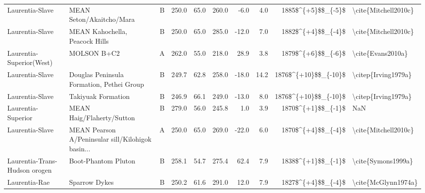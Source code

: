 \begin{longtable}{p{1 in}p{1 in}rrrrrrr}
               Laurentia-Slave &                           MEAN Seton/Akaitcho/Mara &      B &     250.0 &      65.0 & 260.0 &  -6.0 &       4.0 &     1885\$\textasciicircum \{+5\}\$\$\_\{-5\}\$ &                               \textbackslash cite\{Mitchell2010c\} \\
               Laurentia-Slave &                     MEAN Kahochella, Peacock Hills &      B &     250.0 &      65.0 & 285.0 & -12.0 &       7.0 &     1882\$\textasciicircum \{+4\}\$\$\_\{-4\}\$ &                               \textbackslash cite\{Mitchell2010c\} \\
      Laurentia-Superior(West) &                                        MOLSON B+C2 &      A &     262.0 &      55.0 & 218.0 &  28.9 &       3.8 &     1879\$\textasciicircum \{+6\}\$\$\_\{-6\}\$ &                                  \textbackslash cite\{Evans2010a\} \\
               Laurentia-Slave &          Douglas Peninsula Formation, Pethei Group &      B &     249.7 &      62.8 & 258.0 & -18.0 &      14.2 &   1876\$\textasciicircum \{+10\}\$\$\_\{-10\}\$ &                                \textbackslash citep\{Irving1979a\} \\
               Laurentia-Slave &                                 Takiyuak Formation &      B &     246.9 &      66.1 & 249.0 & -13.0 &       8.0 &   1876\$\textasciicircum \{+10\}\$\$\_\{-10\}\$ &                                \textbackslash citep\{Irving1979a\} \\
            Laurentia-Superior &                          MEAN Haig/Flaherty/Sutton &      B &     279.0 &      56.0 & 245.8 &   1.0 &       3.9 &     1870\$\textasciicircum \{+1\}\$\$\_\{-1\}\$ &                                                NaN \\
               Laurentia-Slave &  MEAN Pearson A/Peninsular sill/Kilohigok basin... &      A &     250.0 &      65.0 & 269.0 & -22.0 &       6.0 &     1870\$\textasciicircum \{+4\}\$\$\_\{-4\}\$ &                               \textbackslash cite\{Mitchell2010c\} \\
 Laurentia-Trans-Hudson orogen &                                Boot-Phantom Pluton &      B &     258.1 &      54.7 & 275.4 &  62.4 &       7.9 &     1838\$\textasciicircum \{+1\}\$\$\_\{-1\}\$ &                                 \textbackslash cite\{Symons1999a\} \\
                 Laurentia-Rae &                                      Sparrow Dykes &      B &     250.2 &      61.6 & 291.0 &  12.0 &       7.9 &     1827\$\textasciicircum \{+4\}\$\$\_\{-4\}\$ &                                \textbackslash cite\{McGlynn1974a\} \\

\end{longtable}
